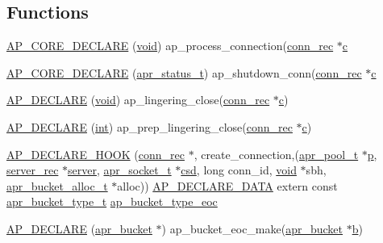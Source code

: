 \subsection*{Functions}
\begin{DoxyCompactItemize}
\item 
\hyperlink{group__APACHE__CORE__CONNECTION_ga7e43ac559aeb8b79d5625c5285688118}{A\+P\+\_\+\+C\+O\+R\+E\+\_\+\+D\+E\+C\+L\+A\+RE} (\hyperlink{group__MOD__ISAPI_gacd6cdbf73df3d9eed42fa493d9b621a6}{void}) ap\+\_\+process\+\_\+connection(\hyperlink{structconn__rec}{conn\+\_\+rec} $\ast$\hyperlink{pcregrep_8txt_aef720ae5f62fa015619d00171d917416}{c}
\item 
\hyperlink{group__APACHE__CORE__CONNECTION_ga3a38ce8f76b525315199316976a81fb1}{A\+P\+\_\+\+C\+O\+R\+E\+\_\+\+D\+E\+C\+L\+A\+RE} (\hyperlink{group__apr__errno_gaa5105fa83cc322f09382292db8b47593}{apr\+\_\+status\+\_\+t}) ap\+\_\+shutdown\+\_\+conn(\hyperlink{structconn__rec}{conn\+\_\+rec} $\ast$\hyperlink{pcregrep_8txt_aef720ae5f62fa015619d00171d917416}{c}
\item 
\hyperlink{group__APACHE__CORE__CONNECTION_ga250677dfbb3dfff898586e28d5044c24}{A\+P\+\_\+\+D\+E\+C\+L\+A\+RE} (\hyperlink{group__MOD__ISAPI_gacd6cdbf73df3d9eed42fa493d9b621a6}{void}) ap\+\_\+lingering\+\_\+close(\hyperlink{structconn__rec}{conn\+\_\+rec} $\ast$\hyperlink{pcregrep_8txt_aef720ae5f62fa015619d00171d917416}{c})
\item 
\hyperlink{group__APACHE__CORE__CONNECTION_ga0c655130b791fe79dcbc335c9f389173}{A\+P\+\_\+\+D\+E\+C\+L\+A\+RE} (\hyperlink{pcre_8txt_a42dfa4ff673c82d8efe7144098fbc198}{int}) ap\+\_\+prep\+\_\+lingering\+\_\+close(\hyperlink{structconn__rec}{conn\+\_\+rec} $\ast$\hyperlink{pcregrep_8txt_aef720ae5f62fa015619d00171d917416}{c})
\item 
\hyperlink{group__APACHE__CORE__CONNECTION_ga07aad536d4c319363fe7efd290c02962}{A\+P\+\_\+\+D\+E\+C\+L\+A\+R\+E\+\_\+\+H\+O\+OK} (\hyperlink{structconn__rec}{conn\+\_\+rec} $\ast$, create\+\_\+connection,(\hyperlink{structapr__pool__t}{apr\+\_\+pool\+\_\+t} $\ast$\hyperlink{group__APACHE__CORE__MPM_ga5cd91701e5c167f2b1a38e70ab57817e}{p}, \hyperlink{structserver__rec}{server\+\_\+rec} $\ast$\hyperlink{group__APR__Util__RC_ga48a1618bc9e57e0406979ef034512520}{server}, \hyperlink{structapr__socket__t}{apr\+\_\+socket\+\_\+t} $\ast$\hyperlink{group__APACHE__CORE__CONNECTION_ga37491385bd0907d7a64ed8a3ec309aaa}{csd}, long conn\+\_\+id, \hyperlink{group__MOD__ISAPI_gacd6cdbf73df3d9eed42fa493d9b621a6}{void} $\ast$sbh, \hyperlink{structapr__bucket__alloc__t}{apr\+\_\+bucket\+\_\+alloc\+\_\+t} $\ast$alloc)) \hyperlink{ap__config_8h_a0bb4c3adf74510a0dcdad5b125725fe0}{A\+P\+\_\+\+D\+E\+C\+L\+A\+R\+E\+\_\+\+D\+A\+TA} extern const \hyperlink{structapr__bucket__type__t}{apr\+\_\+bucket\+\_\+type\+\_\+t} \hyperlink{eoc__bucket_8c_abacd68acbfc383678e17e9f78af31856}{ap\+\_\+bucket\+\_\+type\+\_\+eoc}
\item 
\hyperlink{group__APACHE__CORE__CONNECTION_gad2f9070df581cfd1cd89a02a3b8dba81}{A\+P\+\_\+\+D\+E\+C\+L\+A\+RE} (\hyperlink{structapr__bucket}{apr\+\_\+bucket} $\ast$) ap\+\_\+bucket\+\_\+eoc\+\_\+make(\hyperlink{structapr__bucket}{apr\+\_\+bucket} $\ast$\hyperlink{group__APR__Util__Bucket__Brigades_ga11dc1bdeac74315dbed17465c98879e9}{b})
\end{DoxyCompactItemize}
